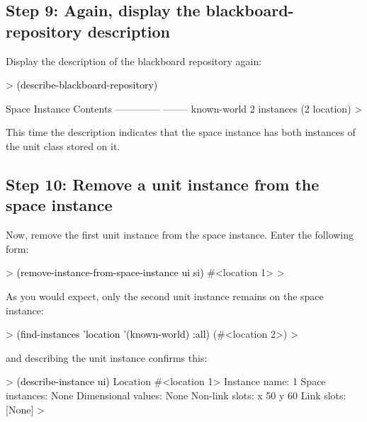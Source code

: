 \documentclass[10pt,twoside,english,pdftex]{article}
\begin{document}
\subsection*{Step 9: Again, display the blackboard-repository description}

%
Display the description of the blackboard repository again:
%
\begin{example}\color{darkergray}%
  > \textcolor{black}{(describe-blackboard-repository)}
  
  Space Instance                Contents
  --------------                --------
  known-world                   2 instances (2 location)
  >
\end{example}

This time the description indicates that the  space instance
has both instances of the  unit class stored on it.

\subsection*{Step 10:  Remove a unit instance from the space instance}

%
%
Now, remove the first  unit instance from the
 space instance.  Enter the following form:
%
\begin{example}\color{darkergray}%
  > \textcolor{black}{(remove-instance-from-space-instance ui si)}
  #<location 1>
  >
\end{example}

%
As you would expect, only the second  unit instance remains on the
 space instance:
%
\begin{example}\color{darkergray}%
  > \textcolor{black}{(find-instances 'location '(known-world) :all)}
  (#<location 2>)
  >
\end{example}
%
and describing the  unit instance confirms this:
%
\begin{example}\color{darkergray}%
  > \textcolor{black}{(describe-instance ui)}
  Location #<location 1>
    Instance name: 1
    Space instances: None
    Dimensional values: None
    Non-link slots:
      x 50
      y 60
    Link slots:
      [None]
  >
\end{example}

\end{document}
